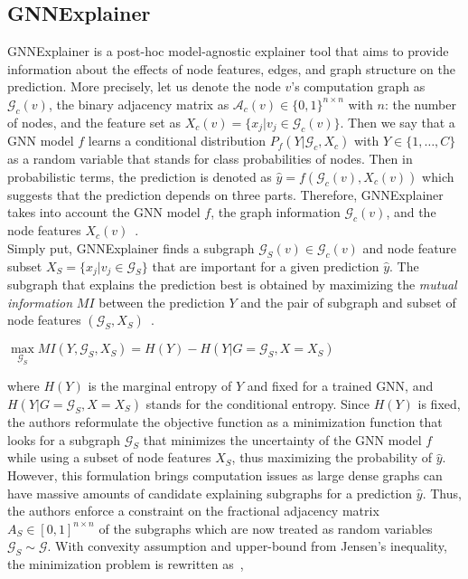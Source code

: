 \subsection{GNNExplainer}
\label{subsec:ExplainingGNNs_GNNExplainer}
GNNExplainer is a post-hoc model-agnostic explainer tool that aims to provide information about the effects of node features, edges, and graph structure on the prediction. More precisely, let us denote the node $v$'s computation graph as $\mathcal{G}_c(v)$, the binary adjacency matrix as $\mathcal{A}_c(v) \in \{0, 1\}^{n \times n}$ with $n$: the number of nodes, and the feature set as $X_c(v) = \{x_j|v_j \in \mathcal{G}_c(v)\}$. Then we say that a GNN model $f$ learns a conditional distribution $P_f(Y | \mathcal{G}_c, X_c)$ with $Y \in \{1, \dots, C\}$ as a random variable that stands for class probabilities of nodes. Then in probabilistic terms, the prediction is denoted as $\hat{y} = f(\mathcal{G}_c(v), X_c(v))$ which suggests that the prediction depends on three parts. Therefore, GNNExplainer takes into account the GNN model $f$, the graph information $\mathcal{G}_c(v)$, and the node features $X_c(v)$~\parencite{GNNExplainer_Ying}.\\
Simply put, GNNExplainer finds a subgraph $\mathcal{G}_S(v) \in \mathcal{G}_c(v)$ and node feature subset $X_S = \{x_j | v_j \in \mathcal{G}_S\}$ that are important for a given prediction $\hat{y}$. The subgraph that explains the prediction best is obtained by maximizing the \emph{mutual information} $MI$ between the prediction $Y$ and the pair of subgraph and subset of node features $(\mathcal{G}_S, X_S)$~\parencite{GNNExplainer_Ying}.
\begin{center}
    $\max\limits_{\mathcal{G}_S} MI(Y, \mathcal{G}_S, X_S) = H(Y) - H(Y|G=\mathcal{G}_S, X=X_S)$
\end{center}
where $H(Y)$ is the marginal entropy of $Y$ and fixed for a trained GNN, and $H(Y|G=\mathcal{G}_S, X=X_S)$ stands for the conditional entropy. Since $H(Y)$ is fixed, the authors reformulate the objective function as a minimization function that looks for a subgraph $\mathcal{G}_S$ that minimizes the uncertainty of the GNN model $f$ while using a subset of node features $X_S$, thus maximizing the probability of $\hat{y}$. However, this formulation brings computation issues as large dense graphs can have massive amounts of candidate explaining subgraphs for a prediction $\hat{y}$. Thus, the authors enforce a constraint on the fractional adjacency matrix $A_S \in [0, 1]^{n \times n}$ of the subgraphs which are now treated as random variables $\mathcal{G}_S \sim \mathcal{G}$. With convexity assumption and upper-bound from Jensen's inequality, the minimization problem is rewritten as~\parencite{GNNExplainer_Ying},
